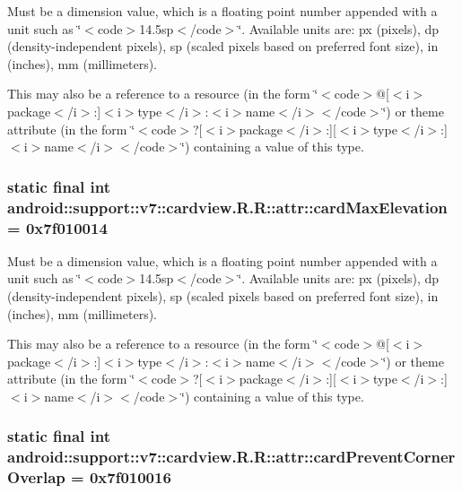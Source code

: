 Must be a dimension value, which is a floating point number appended with a unit such as \char`\"{}$<$code$>$14.5sp$<$/code$>$\char`\"{}. Available units are: px (pixels), dp (density-independent pixels), sp (scaled pixels based on preferred font size), in (inches), mm (millimeters). 

This may also be a reference to a resource (in the form \char`\"{}$<$code$>$@\mbox{[}$<$i$>$package$<$/i$>$:\mbox{]}$<$i$>$type$<$/i$>$:$<$i$>$name$<$/i$>$$<$/code$>$\char`\"{}) or theme attribute (in the form \char`\"{}$<$code$>$?\mbox{[}$<$i$>$package$<$/i$>$:\mbox{]}\mbox{[}$<$i$>$type$<$/i$>$:\mbox{]}$<$i$>$name$<$/i$>$$<$/code$>$\char`\"{}) containing a value of this type. \hypertarget{classandroid_1_1support_1_1v7_1_1cardview_1_1_r_1_1attr_c6036eabc1e43bf10db5816388aece5b}{
\subsubsection[{cardMaxElevation}]{\setlength{\rightskip}{0pt plus 5cm}static final int android::support::v7::cardview.R.R::attr::cardMaxElevation = 0x7f010014}}
\label{classandroid_1_1support_1_1v7_1_1cardview_1_1_r_1_1attr_c6036eabc1e43bf10db5816388aece5b}


Must be a dimension value, which is a floating point number appended with a unit such as \char`\"{}$<$code$>$14.5sp$<$/code$>$\char`\"{}. Available units are: px (pixels), dp (density-independent pixels), sp (scaled pixels based on preferred font size), in (inches), mm (millimeters). 

This may also be a reference to a resource (in the form \char`\"{}$<$code$>$@\mbox{[}$<$i$>$package$<$/i$>$:\mbox{]}$<$i$>$type$<$/i$>$:$<$i$>$name$<$/i$>$$<$/code$>$\char`\"{}) or theme attribute (in the form \char`\"{}$<$code$>$?\mbox{[}$<$i$>$package$<$/i$>$:\mbox{]}\mbox{[}$<$i$>$type$<$/i$>$:\mbox{]}$<$i$>$name$<$/i$>$$<$/code$>$\char`\"{}) containing a value of this type. \hypertarget{classandroid_1_1support_1_1v7_1_1cardview_1_1_r_1_1attr_398c82bd909df6a972005347a81cf79a}{
\subsubsection[{cardPreventCornerOverlap}]{\setlength{\rightskip}{0pt plus 5cm}static final int android::support::v7::cardview.R.R::attr::cardPreventCornerOverlap = 0x7f010016}}
\label{classandroid_1_1support_1_1v7_1_1cardview_1_1_r_1_1attr_398c82bd909df6a972005347a81cf79a}


